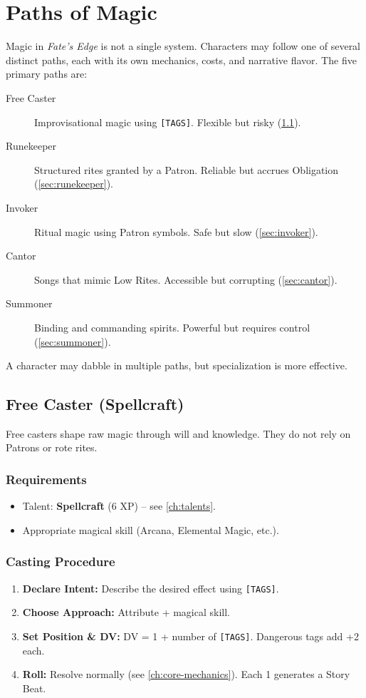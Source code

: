\section{Paths of Magic}
\label{sec:paths-of-magic}

Magic in \textit{Fate's Edge} is not a single system. Characters may follow one of several distinct paths, each with its own mechanics, costs, and narrative flavor. The five primary paths are:

\begin{description}
  \item[Free Caster] Improvisational magic using \texttt{[TAGS]}. Flexible but risky (\ref{sec:free-caster}).
  \item[Runekeeper] Structured rites granted by a Patron. Reliable but accrues Obligation (\ref{sec:runekeeper}).
  \item[Invoker] Ritual magic using Patron symbols. Safe but slow (\ref{sec:invoker}).
  \item[Cantor] Songs that mimic Low Rites. Accessible but corrupting (\ref{sec:cantor}).
  \item[Summoner] Binding and commanding spirits. Powerful but requires control (\ref{sec:summoner}).
\end{description}

A character may dabble in multiple paths, but specialization is more effective.

\subsection{Free Caster (Spellcraft)}
\label{sec:free-caster}

Free casters shape raw magic through will and knowledge. They do not rely on Patrons or rote rites.

\subsubsection*{Requirements}
\begin{itemize}
  \item Talent: \textbf{Spellcraft} (6 XP) – see \ref{ch:talents}.
  \item Appropriate magical skill (Arcana, Elemental Magic, etc.).
\end{itemize}

\subsubsection*{Casting Procedure}
\label{sec:free-casting-procedure}
\begin{enumerate}
  \item \textbf{Declare Intent:} Describe the desired effect using \texttt{[TAGS]}.
  \item \textbf{Choose Approach:} Attribute + magical skill.
  \item \textbf{Set Position \& DV:} DV = 1 + number of \texttt{[TAGS]}. Dangerous tags add +2 each.
  \item \textbf{Roll:} Resolve normally (see \ref{ch:core-mechanics}). Each 1 generates a Story Beat.
\end{enumerate}

